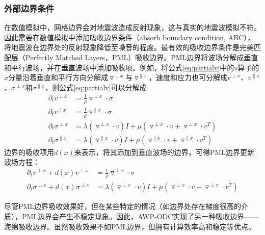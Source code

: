\subsubsection{外部边界条件} %
\label{ssub:外部边界条件}
在数值模拟中，网格边界会对地震波造成反射现象，这与真实的地震波模拟不符。因此需要在数值模拟中添加吸收边界条件（absorb boundary condition, ABC），将地震波在边界处的反射现象降低至噪音的程度。最有效的吸收边界条件是完美匹配层（Perfectly Matched Layers，PML）吸收边界\cite{berenger1994perfectly,berenger1996three}。PML边界将波场分解成垂直和平行波场，并在垂直波场中添加吸收项。例如，将公式\ref{eq:partialv}中的$\triangledown$算子的$x$分量沿着垂直和平行方向分解成$\triangledown^{\perp x}$与$\triangledown^{\parallel x}$，速度和应力也可分解成$v^{\perp x}$、$v^{\parallel x}$、$\sigma^{\perp x}$和$\sigma^{\parallel x}$，则公式\ref{eq:partialv}可以分解成
\begin{equation}
  \begin{aligned}
    \partial _t v^{\perp x} &= \frac{1}{\rho}\triangledown ^{\perp x} \cdot \sigma  \\
    \partial _t v^{\parallel x} &= \frac{1}{\rho}\triangledown ^{\parallel x} \cdot \sigma  \\
\partial _{t}\sigma^{\perp x} &= \lambda(\triangledown ^{\perp x}\cdot v)I + \mu(\triangledown ^{\perp x} \cdot v + \triangledown ^{\perp x}\cdot v^T) \\
\partial _{t}\sigma^{\parallel x} &= \lambda(\triangledown ^{\parallel x}\cdot v)I + \mu(\triangledown ^{\parallel x} \cdot v + \triangledown ^{\parallel x}\cdot v^T)
  \end{aligned}
\end{equation}
边界的吸收项用$d(x)$来表示，将其添加到垂直波场的边界，可得PML边界更新波场方程：
\begin{equation}
  \begin{aligned}
    \partial _t v^{\perp x} +d(x)v^{\perp x} &= \frac{1}{\rho}\triangledown ^{\perp x} \cdot \sigma  \\
    \partial _{t}\sigma^{\perp x} + d(x)\sigma^{\perp x} &= \lambda(\triangledown ^{\perp x}\cdot v)I + \mu(\triangledown ^{\perp x} \cdot v + \triangledown ^{\perp x}\cdot v^T)
  \end{aligned}
\end{equation}

尽管PML边界吸收效果好，但在某些特定的情况（如边界处存在梯度很高的介质），PML边界会产生不稳定现象\cite{marcinkovich2002implementation}。因此，AWP-ODC实现了另一种吸收边界——海绵吸收边界\cite{cerjan1985nonreflecting}。虽然吸收效果不如PML边界，但拥有计算效率高和稳定等优点。

